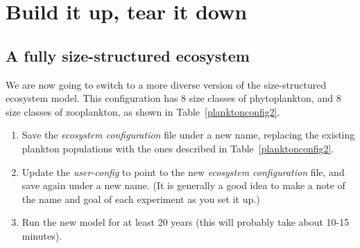 \documentclass[11pt,fleqn]{book} %
\begin{document}

\newpage


\section{Build it up, tear it down}


\subsection{A fully size-structured  ecosystem} We are now going to switch to a more diverse version of the size-structured ecosystem model. This configuration has 8 size classes of phytoplankton, and 8 size classes of zooplankton, as shown in Table~\ref{planktonconfig2}.

\begin{enumerate}[noitemsep]
\vspace{1mm}
\item Save the \textit{ecosystem configuration} file under a new name, replacing the existing plankton populations with the ones described in Table~\ref{planktonconfig2}.
\vspace{1mm}
\item Update the \textit{user-config} to point to the new \textit{ecosystem configuration} file, and save again under a new name. (It is generally a good idea to make a note of the name and goal of each experiment as you set it up.)
\vspace{1mm}
\item Run the new model for at least 20 years (this will probably take about 10-15 minutes). 
\end{enumerate}
\vspace{2mm}
\end{document}
